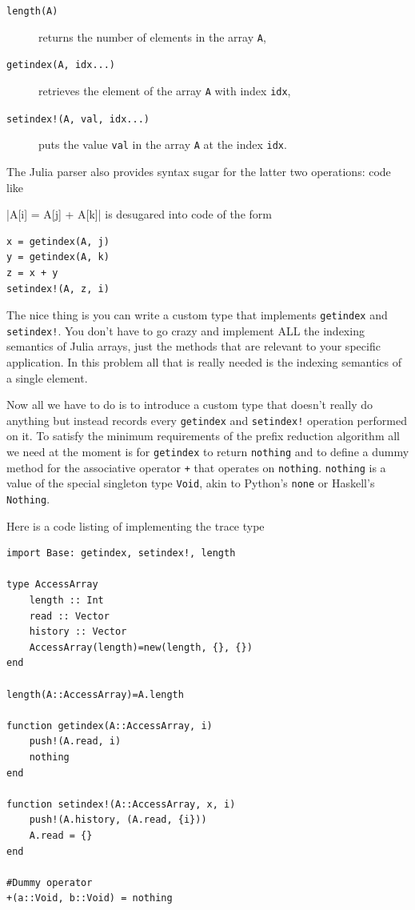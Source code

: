 \documentclass{sig-alternate}
\newcommand{\code}[1]{\texttt{#1}}
\newcommand{\TODO}[1]{\todo[inline]{#1}}
\begin{document}
\begin{description}
	\item[\code{length(A)}] returns the number of elements in the array
	      \code{A},
      	\item[\code{getindex(A, idx...)}] retrieves the element of the array
	      \code{A} with index \code{idx},
      	\item[\code{setindex!(A, val, idx...)}] puts the value \code{val} in
	      the array \code{A} at the index \code{idx}.
\end{description}

The Julia parser also provides syntax sugar for the latter two operations: code
like

|A[i] = A[j] + A[k]|
%
is desugared into code of the form

\begin{verbatim}
x = getindex(A, j)
y = getindex(A, k)
z = x + y
setindex!(A, z, i)
\end{verbatim}

\TODO{Rewrite the next two paragraphs}

The nice thing is you can write a custom type that implements \code{getindex} and \code{setindex!}. You don't have to go crazy and implement ALL the indexing semantics of Julia arrays, just the methods that are relevant to your specific application. In this problem all that is really needed is the indexing semantics of a single element.

Now all we have to do is to introduce a custom type that doesn't really do anything but instead records every \code{getindex} and \code{setindex!} operation performed on it. To satisfy the minimum requirements of the prefix reduction algorithm all we need at the moment is for \code{getindex} to return \code{nothing} and to define a dummy method for the associative operator \code{+} that operates on \code{nothing}. \code{nothing} is a value of the special singleton type \code{Void}, akin to Python's \code{none} or Haskell's \code{Nothing}.

Here is a code listing of implementing the trace type

\begin{verbatim}
import Base: getindex, setindex!, length

type AccessArray
    length :: Int
    read :: Vector
    history :: Vector
    AccessArray(length)=new(length, {}, {})
end

length(A::AccessArray)=A.length

function getindex(A::AccessArray, i)
    push!(A.read, i)
    nothing
end

function setindex!(A::AccessArray, x, i)
    push!(A.history, (A.read, {i}))
    A.read = {}
end

#Dummy operator
+(a::Void, b::Void) = nothing
\end{verbatim}
\end{document}

